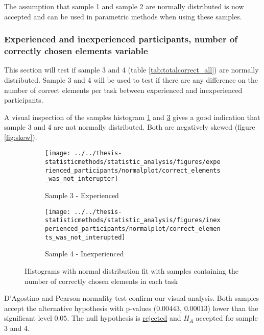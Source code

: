 The assumption that sample 1 and sample 2 are normally distributed is now accepted and can be used in parametric methods when using these samples.

\subsubsection[Sample 3 and 4]{Experienced and inexperienced participants, number of correctly chosen elements variable}\label{sec:correct_ex_inex}
This section will test if sample 3 and 4 (table \ref{tab:totalcorrect_all}) are normally distributed. Sample 3 and 4 will be used to test if there are any difference on the number of correct elements per task between experienced and inexperienced participants. 

A visual inspection of the samples histogram \ref{fig:correctelementswasnotinterupter_ex} and \ref{fig:correctelementswasnotinterupted_inex} gives a good indication that sample 3 and 4 are not normally distributed. Both are negatively skewed (figure \ref{fig:skew}).   

\begin{figure}[h!]
	\centering
	\begin{subfigure}[b]{0.48\textwidth}
		\centering
		\texttt{[image: ../../thesis-statisticmethods/statistic\_analysis/figures/experienced\_participants/normalplot/correct\_elements\_was\_not\_interupter]}
		\caption{Sample 3 - Experienced}
		\label{fig:correctelementswasnotinterupter_ex}
	\end{subfigure}
	\begin{subfigure}[b]{0.48\textwidth}
		\centering
		\texttt{[image: ../../thesis-statisticmethods/statistic\_analysis/figures/inexperienced\_participants/normalplot/correct\_elements\_was\_not\_interupted]}
		\caption{Sample 4 - Inexperienced}
		\label{fig:correctelementswasnotinterupted_inex}
	\end{subfigure}
	\caption{Histograms with normal distribution fit with samples containing the number of correctly chosen elements in each task}
\end{figure}

D'Agostino and Pearson normality test confirm our visual analysis. Both samples accept the alternative hypothesis with p-values ($0.00443$, $0.00013$) lower than the significant level $0.05$. The null hypothesis is \underline{rejected} and $H_A$ accepted for sample 3 and 4. \\[0.3cm]
\vspace{0.3cm}

